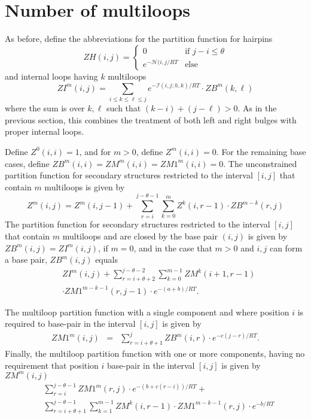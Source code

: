\section{Number of multiloops}
\label{section:multiloopNumberPartitionFunction}



As before, define the abbreviations for the partition function for
hairpins
\[
ZH(i,j) =
\left\{ \begin{array}{ll}
0 &\mbox{if $j-i \leq \theta$}\\
e^{-\mathcal{H}(i,j/RT} &\mbox{else}
\end{array} \right.
\]
and internal loops having $k$ multiloops
\[
ZI^m(i,j) =  \displaystyle\sum_{i \leq k \leq \ell \leq j}
e^{-\mathcal{I}(i,j;h,k)/RT} \cdot ZB^m(k,\ell)
\]
where the sum is over $k,\ell$ such that $(k-i)+(j-\ell)>0$. As
in the previous section, this combines the
treatment of both left and right bulges with proper internal loops.

Define $Z^0(i,i)=1$, and for $m> 0$, define $Z^m(i,i)=0$. For the remaining
base cases, define $ZB^m(i,i)= ZM^m(i,i)= ZM1^m(i,i)=0$.
The unconstrained partition function for secondary structures
restricted to the interval $[i,j]$ that contain $m$ multiloops is given by
\[
Z^m(i,j) = Z^m(i,j-1)+
\sum_{r=i}^{j-\theta-1} \sum_{k=0}^m Z^k(i,r-1) \cdot ZB^{m-k}(r,j)
\]
The partition function for secondary structures restricted to the
interval $[i,j]$ that contain $m$ multiloops and are closed by
the base pair $(i,j)$ is given by
$ZB^m(i,j) = ZI^m(i,j)$, if $m=0$, and in the case that $m>0$ and
$i,j$ can form a base pair,
$ZB^m(i,j)$ equals
\begin{eqnarray*}
&ZI^m(i,j) + \displaystyle\sum_{r=i+\theta+2}^{j-\theta-2} \sum_{k=0}^{m-1}
     ZM^{k}(i+1,r-1) \\
&\cdot ZM1^{m-k-1}(r,j-1) \cdot e^{-(a+b)/RT}.
\end{eqnarray*}


The multiloop partition function with a single component and where
position $i$ is required to base-pair in the interval $[i,j]$ is given by
\begin{eqnarray}
ZM1^{m}(i,j) &= &
\displaystyle\sum_{r=i+\theta+1}^j ZB^m(i,r) \cdot
e^{-c(j-r)/RT} .
\end{eqnarray}
Finally, the multiloop partition function with one or more components,
having no requirement that position $i$ base-pair in the interval $[i,j]$
is given by $ZM^{m}(i,j)$
\begin{eqnarray}
&\displaystyle\sum_{r=i}^{j-\theta-1}  ZM1^{m}(r,j) \cdot
e^{-(b+c(r-i))/RT}  + \\
&\displaystyle\sum_{r=i+\theta+1}^{j-\theta-1} \sum_{k=1}^{m-1}
ZM^{k}(i,r-1) \cdot ZM1^{m-k-1}(r,j) \cdot e^{-b/RT}  \nonumber
\end{eqnarray}


